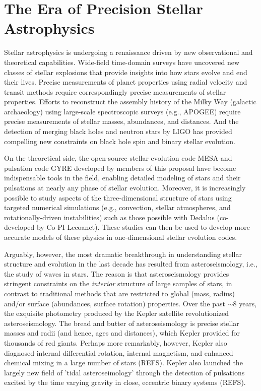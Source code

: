 \section{The Era of Precision Stellar Astrophysics}

Stellar astrophysics is undergoing a renaissance driven by new observational and theoretical capabilities. Wide-field time-domain surveys have uncovered new classes of stellar explosions that provide insights into how stars evolve and end their lives.  Precise measurements of planet properties using radial velocity and transit methods require correspondingly precise measurements of stellar properties. Efforts to reconstruct the assembly history of the Milky Way (galactic archaeology) using large-scale spectroscopic surveys (e.g., APOGEE) require precise measurements of stellar masses, abundances, and distances. And the detection of merging black holes and neutron stars by LIGO has provided compelling new constraints on black hole spin and binary stellar evolution.   

On the theoretical side, the open-source stellar evolution code MESA and pulsation code GYRE developed by members of this proposal have become indispensable tools in the field, enabling detailed modeling of stars and their pulsations at nearly any phase of stellar evolution.  Moreover, it is increasingly possible to study aspects of the three-dimensional structure of stars using targeted numerical simulations (e.g., convection, stellar atmospheres, and rotationally-driven instabilities) such as those possible with Dedalus (co-developed by Co-PI Lecoanet). These studies can then be used to develop more accurate models of these physics in one-dimensional stellar evolution codes.

Arguably, however, the most dramatic breakthrough in understanding stellar structure and evolution in the last decade has resulted from asteroseismology, i.e., the study of waves in stars.  The reason is that asteroseismology provides stringent constraints on the {\em interior} structure of large samples of stars, in contrast to traditional methods that are restricted to global (mass, radius) and/or surface (abundances, surface rotation) properties. Over the past $\sim 8$ years, the exquisite photometry produced by the Kepler satellite revolutionized asteroseismology.  The bread and butter of asteroseismology is precise stellar masses and radii (and hence, ages and distances), which Kepler provided for thousands of red giants.  Perhaps more remarkably, however, Kepler also diagnosed internal differential rotation, internal magnetism, and enhanced chemical mixing in a large number of stars (REFS).  Kepler also launched the largely new field of 'tidal asteroseimology' through the detection of pulsations excited by the time varying gravity in close, eccentric binary systems (REFS). 

